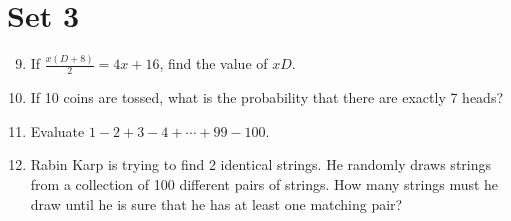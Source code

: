 \documentclass[11pt]{article}
\theoremstyle{definition}
\begin{document}
\section*{Set 3}
\begin{enumerate}
\setcounter{enumi}{8}
\item If $\frac{x(D+8)}{2} = 4x + 16$, find the value of $xD$.
\item If 10 coins are tossed, what is the probability that there are exactly 7 heads?
\item Evaluate $1-2+3-4+\dotsb+99-100$.
\item Rabin Karp is trying to find 2 identical strings. He randomly draws strings from a collection of 100 different pairs of strings. How many strings must he draw until he is sure that he has at least one matching pair?
\end{enumerate}
\end{document}
